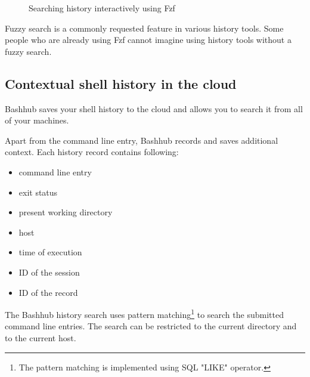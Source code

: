 \begin{figure}[h!]
  \caption{Searching history interactively using Fzf}
  \label{fzf-screenshot}
\end{figure}

Fuzzy search is a commonly requested feature in various history tools. Some people who are already using Fzf cannot imagine using history tools without a fuzzy search.

\subsection{Contextual shell history in the cloud}


Bashhub\cite{toolsbashhubclient} saves your shell history to the cloud and allows you to search it from all of your machines.

Apart from the command line entry, Bashhub records and saves additional context. Each history record contains following:
\begin{itemize}
    \item command line entry
    \item exit status
    \item present working directory
    \item host
    \item time of execution
    \item ID of the session
    \item ID of the record
\end{itemize}

The Bashhub history search uses pattern matching\footnote{The pattern matching is implemented using SQL "LIKE" operator.} to search the submitted command line entries. The search can be restricted to the current directory and to the current host.


